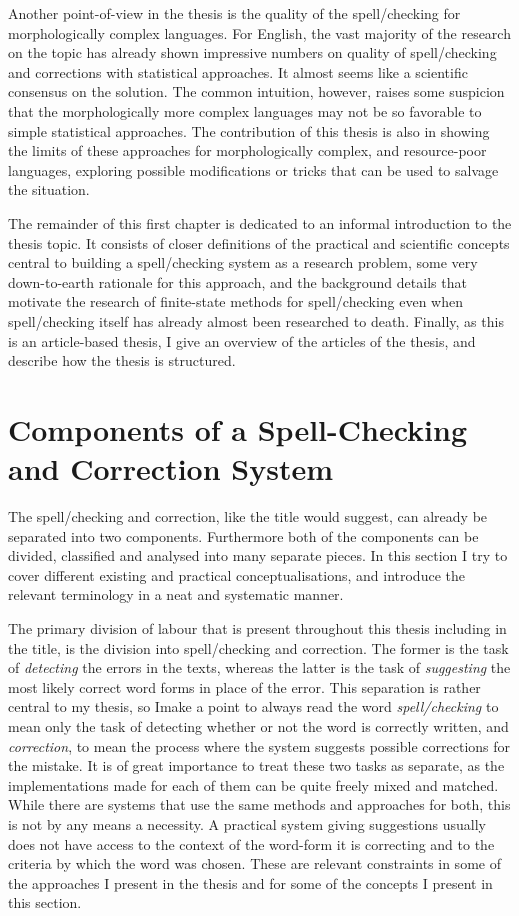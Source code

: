 \documentclass[officiallayout]{unihelcompling}
\begin{document}
Another point-of-view in the thesis is the quality of the spell\-/checking for
morphologically complex languages. For English, the vast majority of the
research on the topic has already shown impressive numbers on quality of
spell\-/checking and corrections with statistical approaches. It almost seems
like a scientific consensus on the solution. The common intuition,
however, raises some suspicion that the morphologically more complex languages
may not be so favorable to simple statistical approaches. The contribution of
this thesis is also in showing the limits of these approaches for
morphologically complex, and resource-poor languages, exploring possible
modifications or tricks that can be used to salvage the situation.

The remainder of this first chapter is dedicated to an informal introduction to
the thesis topic. It consists of closer definitions of the practical and
scientific concepts central to building a spell\-/checking system as a research
problem, some very down-to-earth rationale for this approach, and the
background details that motivate the research of finite-state methods for
spell\-/checking even when spell\-/checking itself has already almost been
researched to death. Finally, as this is an article-based thesis, I give an
overview of the articles of the thesis, and describe how the thesis is
structured.

\section{Components of a Spell-Checking and Correction System}
\label{sec:practical-components}

The spell\-/checking and correction, like the title would suggest, can already be
separated into two components. Furthermore both of the components can be
divided, classified and analysed into many separate pieces. In this section I
try to cover different existing and practical conceptualisations, and introduce
the relevant terminology in a neat and systematic manner.

The primary division of labour that is present throughout this thesis including
in the title, is the division into spell\-/checking and correction. The former is
the task of \emph{detecting} the errors in the texts, whereas the latter is the
task of \emph{suggesting} the most likely correct word forms in place of the
error. This separation is rather central to my thesis, so Imake a point to
always read the word \emph{spell\-/checking} to mean only the task of detecting
whether or not the word is correctly written, and \emph{correction}, to mean
the process where the system suggests possible corrections for the mistake.  It
is of great importance to treat these two tasks as separate, as the
implementations made for each of them can be quite freely mixed and matched.
While there are systems that use the same methods and approaches for both, this
is not by any means a necessity. A practical system giving suggestions usually
does not have access to the context of the word-form it is correcting and to
the criteria by which the word was chosen. These are relevant constraints in
some of the approaches I present in the thesis and for some of the concepts I
present in this section.
\end{document}
